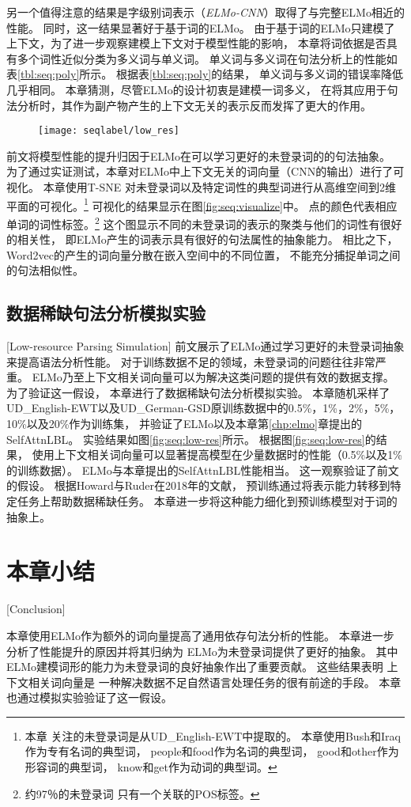 另一个值得注意的结果是字级别词表示（\textit{ELMo-CNN}）取得了与完整ELMo相近的性能。
同时，这一结果显著好于基于词的ELMo。
由于基于词的ELMo只建模了上下文，为了进一步观察建模上下文对于模型性能的影响，
本章将词依据是否具有多个词性近似分类为多义词与单义词。
单义词与多义词在句法分析上的性能如表\ref{tbl:seq:poly}所示。
根据表\ref{tbl:seq:poly}的结果，
单义词与多义词的错误率降低几乎相同。
本章猜测，尽管ELMo的设计初衷是建模一词多义，
在将其应用于句法分析时，其作为副产物产生的上下文无关的表示反而发挥了更大的作用。

\begin{figure}[t]
	\centering
	\texttt{[image: seqlabel/low\_res]}
\end{figure}
前文将模型性能的提升归因于ELMo在可以学习更好的未登录词的的句法抽象。
为了通过实证测试，本章对ELMo中上下文无关的词向量（CNN的输出）进行了可视化。
本章使用T-SNE \cite{maaten2008visualizing}对未登录词以及特定词性的典型词进行从高维空间到2维平面的可视化。\footnote{本章
	关注的未登录词是从{UD\_English-EWT}中提取的。
	本章使用{Bush}和{Iraq}作为专有名词的典型词，
	{people}和{food}作为名词的典型词，
	{good}和{other}作为形容词的典型词，
	{know}和{get}作为动词的典型词。}
可视化的结果显示在图\ref{fig:seq:visualize}中。
点的颜色代表相应单词的词性标签。\footnote {约97％的未登录词
	只有一个关联的POS标签。}
这个图显示不同的未登录词的表示的聚类与他们的词性有很好的相关性，
即ELMo产生的词表示具有很好的句法属性的抽象能力。
相比之下，Word2vec的产生的词向量分散在嵌入空间中的不同位置，
不能充分捕捉单词之间的句法相似性。

\subsection{数据稀缺句法分析模拟实验}[Low-resource Parsing Simulation]\label{sec:seq:anal:low-res}
前文展示了ELMo通过学习更好的未登录词抽象来提高语法分析性能。
对于训练数据不足的领域，未登录词的问题往往非常严重。
ELMo乃至上下文相关词向量可以为解决这类问题的提供有效的数据支撑。
为了验证这一假设，
本章进行了数据稀缺句法分析模拟实验。
本章随机采样了UD\_English-EWT以及UD\_German-GSD原训练数据中的0.5\%，1\%，2\%，5\%，10\%以及20\%作为训练集，
并验证了ELMo以及本章第\ref{chp:elmo}章提出的SelfAttnLBL。
实验结果如图\ref{fig:seq:low-res}所示。
根据图\ref{fig:seq:low-res}的结果，
使用上下文相关词向量可以显著提高模型在少量数据时的性能（0.5\%以及1\%的训练数据）。
ELMo与本章提出的SelfAttnLBL性能相当。
这一观察验证了前文的假设。
根据Howard与Ruder在2018年的文献，
预训练通过将表示能力转移到特定任务上帮助数据稀缺任务。
本章进一步将这种能力细化到预训练模型对于词的抽象上。

\section{本章小结}[Conclusion]

本章使用ELMo作为额外的词向量提高了通用依存句法分析的性能。
本章进一步分析了性能提升的原因并将其归纳为
ELMo为未登录词提供了更好的抽象。
其中ELMo建模词形的能力为未登录词的良好抽象作出了重要贡献。
这些结果表明
上下文相关词向量是
一种解决数据不足自然语言处理任务的很有前途的手段。
本章也通过模拟实验验证了这一假设。